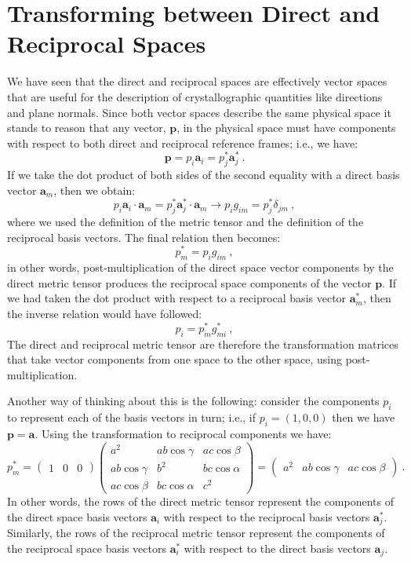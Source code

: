 \section{Transforming between Direct and Reciprocal Spaces}\label{\chabbr:sec:transform}
We have seen that the direct and reciprocal spaces are effectively vector spaces that are useful for the description of crystallographic quantities like directions and plane normals. Since both vector spaces describe the same physical space it stands to reason that any vector, $\mathbf{p}$, in the physical space must have components with respect to both direct and reciprocal reference frames; i.e., we have:
\[
	 \mathbf{p} = p_i\mathbf{a}_i = p^{\ast}_j\mathbf{a}^{\ast}_j\ .
\]
If we take the dot product of both sides of the second equality with a direct basis vector $\mathbf{a}_m$, then we obtain:
\[
	p_i\mathbf{a}_i\cdot\mathbf{a}_m = p^{\ast}_j\mathbf{a}^{\ast}_j\cdot\mathbf{a}_m\rightarrow p_i g_{im} = p^{\ast}_j\delta_{jm}\ ,
\]
where we used the definition of the metric tensor and the definition of the reciprocal basis vectors. The final relation then becomes:
\begin{equation}
	 p^{\ast}_m = p_i g_{im}\ , \label{\chabbr:eq:d2r}
\end{equation}
in other words, post-multiplication of the direct space vector components by the direct metric tensor produces the reciprocal space components of the vector $\mathbf{p}$. If we had taken the dot product with respect to a reciprocal basis vector $\mathbf{a}^{\ast}_m$, then the inverse relation would have followed:
\begin{equation}
	 p_i = p^{\ast}_m g^{\ast}_{mi}\ , \label{\chabbr:eq:r2d}
\end{equation}
The direct and reciprocal metric tensor are therefore the transformation matrices that take vector components from one space to the other space, using post-multiplication.

Another way of thinking about this is the following: consider the components $p_i$ to represent each of the basis vectors in turn; i.e., if $p_i=(1,0,0)$ then we have $\mathbf{p}=\mathbf{a}$. Using the transformation to reciprocal components we have:
\[
	p^{\ast}_m = \begin{pmatrix}1 & 0 & 0\end{pmatrix} \begin{pmatrix}a^2 & a b \cos\gamma & a c \cos\beta\\
	 a b \cos\gamma & b^2 & b c \cos\alpha\\
	 a c \cos\beta & b c \cos\alpha & c^2\end{pmatrix} = \begin{pmatrix}a^2 & a b \cos\gamma & a c \cos\beta\end{pmatrix}\ .
\]
In other words, the rows of the direct metric tensor represent the components of the direct space basis vectors $\mathbf{a}_i$ with respect to the reciprocal basis vectors $\mathbf{a}^{\ast}_j$. Similarly, the rows of the reciprocal metric tensor represent the components of the reciprocal space basis vectors $\mathbf{a}^{\ast}_i$ with respect to the direct basis vectors $\mathbf{a}_j$.  

